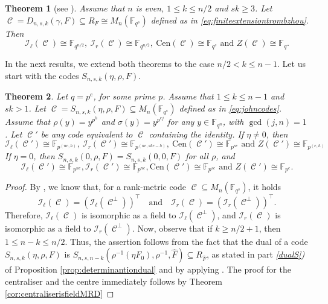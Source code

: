 \documentclass[a4paper, 11pt]{article}
\DeclareMathOperator{\C}{\mathcal{C}}
\newtheorem{theorem}{Theorem}[section]
\newcommand{\fqn}{\mathbb{F}_{q^n}}
\newcommand{\F}{{\mathbb F}}
\newcommand{\lid}{\mathcal{I}_{\ell}}
\newcommand{\rid}{\mathcal{I}_{r}}
\newcommand{\cen}{\mathrm{Cen}}
\begin{document}
\begin{theorem}  [see \textnormal{\cite[Theorem 6.2]{lobillo2025quotients}}]\label{th:parametersextensiontrombetti}
Assume that \(n\) is even, $1 \leq k \leq n/2$ and $sk\geq 3$. Let $\C=D_{n,s,k}(\gamma,F) \subseteq R_F \cong M_n(\F_{q^s})$ defined as in \eqref{eq:finiteextensiontrombzhou}. Then
\[
\lid(\C)  \cong \F_{q^{n/2}}, \ \rid(\C) \cong  \F_{q^{n/2}}, \ \cen(\C)  \cong  \F_{q^s} \mbox{ and }  Z(\C) \cong  \F_{q}.
\]
\end{theorem}



In the next results, we extend both theorems to the case $n/2 < k \leq n-1$. Let us start with the codes $S_{n,s,k}(\eta,\rho,F)$. 

\begin{theorem} \label{th:parconstrsheekey2}
Let $q=p^e$, for some prime $p$.  Assume that $1 \leq k \leq n-1$ and $sk>1$. Let $\C=S_{n,s,k}(\eta,\rho,F) \subseteq M_n(\F_{q^s})$ defined as in \eqref{eq:johncodes}. Assume that $\rho(y)=y^{p^h}$ and $\sigma(y)=y^{p^{ej}}$ for any $y \in \fqn$, with $\gcd(j,n)=1$. Let $\C'$ be any code equivalent to $\C$ containing the identity.  If $\eta \neq 0$, then 
\[
\lid(\C')  \cong \F_{p^{(ne,h)}},\ \rid(\C') \cong  \F_{p^{(ne,ske-h)}},\ \cen(\C') \cong \F_{p^{se}} \mbox{ and } Z(\C') \cong  \F_{p^{(e,h)}}
\]
If $\eta = 0$, then $S_{n,s,k}(0,\rho,F)=S_{n,s,k}(0,0,F)$ for all $\rho$, and 
\[
\lid(\C') \cong \F_{p^{ne}}, \rid(\C')  \cong  \F_{p^{ne}}, \cen(\C')  \cong  \F_{p^{se}} \mbox{ and } Z(\C') \cong  \F_{p^e}.
\]
\end{theorem}

\begin{proof}
By \cite[Proposition 4.2]{lunardon2018nuclei}, we know that, for a rank-metric code $\C \subseteq M_n(\F_{q^s})$, it holds 
\[
\lid(\C)=(\lid(\C^{\perp}))^{\top} \ \ \ \mbox{ and }\ \ \ \rid(\C)=(\rid(\C^{\perp}))^{\top}.
\]
Therefore, $\lid(\C)$ is isomorphic as a field to $\lid(\C^{\perp})$, and $\rid(\C)$ is isomorphic as a field to $\rid(\C^{\perp})$. Now, observe that if $k \geq n/2 + 1$, then $1 \leq n - k \leq n/2$. Thus, the assertion follows from the fact that the dual of a code $S_{n,s,k}(\eta, \rho, F)$ is $S_{n,s,n-k}(\rho^{-1}(\eta F_0), \rho^{-1}, \hat{F}) \subseteq R_{\hat{F}}$, as stated in part \emph{\ref{dualS})} of Proposition \ref{prop:determinantiondual} and by applying .
The proof for the centraliser and the centre immediately follows by Theorem  \ref{cor:centraliserisfieldMRD}
\end{proof}
\end{document}
